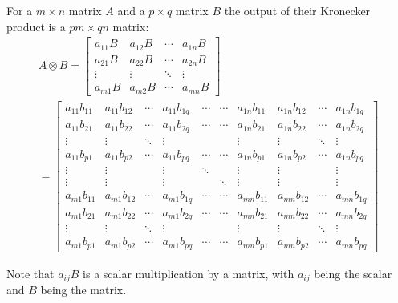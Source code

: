 For a $m \times n$ matrix  $A$ and a $p \times q$ matrix  $B$ the output of their Kronecker product \cite{QCandQI:kronecker} is a $pm \times qn$ matrix:
\begin{multline*}
A \otimes B = \begin{bmatrix}
	a_{11} B & a_{12} B & \cdots & a_{1n}B \\
	a_{21} B & a_{22} B & \cdots & a_{2n}B \\
	\vdots & \vdots & \ddots &           \vdots \\
	a_{m1} B & a_{m2} B & \cdots & a_{mn} B
\end{bmatrix} \\
= \begin{bmatrix}
a_{11} b_{11} & a_{11} b_{12} & \cdots & a_{11} b_{1q} &
\cdots & \cdots & a_{1n} b_{11} & a_{1n} b_{12} & \cdots & a_{1n} b_{1q} \\
a_{11} b_{21} & a_{11} b_{22} & \cdots & a_{11} b_{2q} &
\cdots & \cdots & a_{1n} b_{21} & a_{1n} b_{22} & \cdots & a_{1n} b_{2q} \\
\vdots & \vdots & \ddots & \vdots & & & \vdots & \vdots & \ddots & \vdots \\
a_{11} b_{p1} & a_{11} b_{p2} & \cdots & a_{11} b_{pq} &
\cdots & \cdots & a_{1n} b_{p1} & a_{1n} b_{p2} & \cdots & a_{1n} b_{pq} \\
\vdots & \vdots & & \vdots & \ddots & & \vdots & \vdots & & \vdots \\
\vdots & \vdots & & \vdots & & \ddots & \vdots & \vdots & & \vdots \\
a_{m1} b_{11} & a_{m1} b_{12} & \cdots & a_{m1} b_{1q} &
\cdots & \cdots & a_{mn} b_{11} & a_{mn} b_{12} & \cdots & a_{mn} b_{1q} \\
a_{m1} b_{21} & a_{m1} b_{22} & \cdots & a_{m1} b_{2q} &
\cdots & \cdots & a_{mn} b_{21} & a_{mn} b_{22} & \cdots & a_{mn} b_{2q} \\
\vdots & \vdots & \ddots & \vdots & & & \vdots & \vdots & \ddots & \vdots \\
a_{m1} b_{p1} & a_{m1} b_{p2} & \cdots & a_{m1} b_{pq} &
\cdots & \cdots & a_{mn} b_{p1} & a_{mn} b_{p2} & \cdots & a_{mn} b_{pq}
\end{bmatrix}
\end{multline*}

Note that $a_{ij}B$ is a scalar multiplication by a matrix, with $a_{ij}$ being the scalar and $B$ being the matrix.

